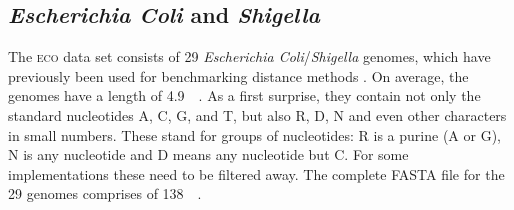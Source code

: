 \documentclass[a4paper,
  10pt,
  english,
  DIV=12,
  BCOR=8mm]{scrbook}
\newcommand{\algo}[1]{\textsc{{#1}}}
\newcommand{\wchar}[1]{\textsf{\small#1}}
\newcommand{\eco}{\textsc{eco}\oldstylenums{29}\xspace}
\begin{document}
\subsection*{\textit{Escherichia Coli} and \textit{Shigella}}\label{sec:eco29}

The \eco data set consists of 29 \emph{Escherichia Coli}/\emph{Shigella} genomes, which have previously been used for benchmarking distance methods \cite{cophylog,andi}. On average, the genomes have a length of \SI{4.9}{\mega\basepairs}. As a first surprise, they contain not only the standard nucleotides \wchar{A, C, G,} and \wchar{T}, but also \wchar{R, D, N} and even other characters in small numbers. These stand for groups of nucleotides: \wchar{R} is a purine (\wchar{A} or \wchar{G}), \wchar{N} is any nucleotide and \wchar{D} means any nucleotide but \wchar{C}. For some implementations these need to be filtered away. The complete \algo{FASTA} file for the 29 genomes comprises of \SI{138}{\mega\byte}.
\end{document}
